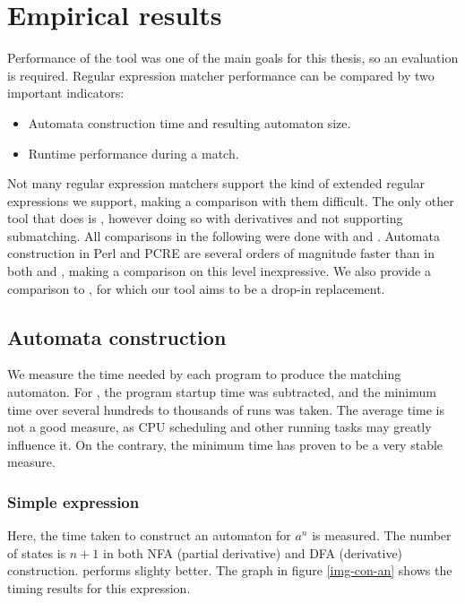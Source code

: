 \chapter{Empirical results}
\label{results}

Performance of the tool was one of the main goals for this thesis, so an
evaluation is required. Regular expression matcher performance can be compared
by two important indicators:

\begin{itemize}
   \item Automata construction time and resulting automaton size.
   \item Runtime performance during a match.
\end{itemize}

Not many regular expression matchers support the kind of extended regular
expressions we support, making a comparison with them difficult. The only other
tool that does is \mlulex{}, however doing so with derivatives and not
supporting submatching. All comparisons in the following were done with \dreml{}
and \mlulex{}. Automata construction in Perl and PCRE are several orders of
magnitude faster than in both \dreml{} and \mlulex{}, making a comparison on this
level inexpressive. We also provide a comparison to \ocamllex{}, for which our
tool aims to be a drop-in replacement.


\section{Automata construction}

We measure the time needed by each program to produce the matching automaton.
For \mlulex{}, the program startup time was subtracted, and the minimum time
over several hundreds to thousands of runs was taken. The average time is not a
good measure, as CPU scheduling and other running tasks may greatly influence
it. On the contrary, the minimum time has proven to be a very stable measure.


\subsection{Simple expression}

Here, the time taken to construct an automaton for $a^n$ is measured. The number
of states is $n + 1$ in both NFA (partial derivative) and DFA (derivative)
construction. \mlulex{} performs slighty better. The graph in figure
\ref{img-con-an} shows the timing results for this expression.

